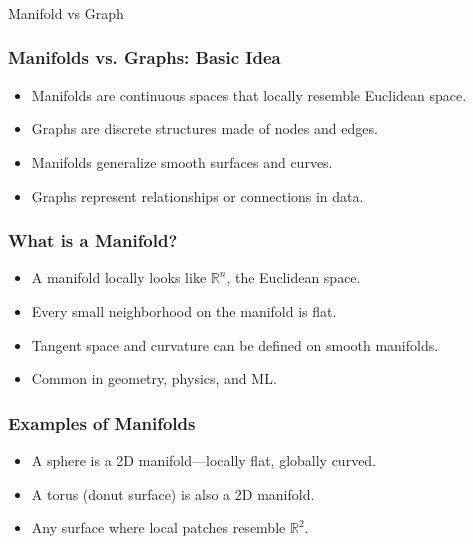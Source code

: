 \begin{frame}[fragile]\frametitle{}
\begin{center}
{\Large Manifold vs Graph}
\end{center}
\end{frame}

\begin{frame}[fragile]\frametitle{Manifolds vs. Graphs: Basic Idea}
    \begin{itemize}
        \item Manifolds are continuous spaces that locally resemble Euclidean space.
        \item Graphs are discrete structures made of nodes and edges.
        \item Manifolds generalize smooth surfaces and curves.
        \item Graphs represent relationships or connections in data.
    \end{itemize}
\end{frame}

\begin{frame}[fragile]\frametitle{What is a Manifold?}
    \begin{itemize}
        \item A manifold locally looks like \(\mathbb{R}^n\), the Euclidean space.
        \item Every small neighborhood on the manifold is flat.
        \item Tangent space and curvature can be defined on smooth manifolds.
        \item Common in geometry, physics, and ML.
    \end{itemize}
\end{frame}

\begin{frame}[fragile]\frametitle{Examples of Manifolds}
    \begin{itemize}
        \item A sphere is a 2D manifold—locally flat, globally curved.
        \item A torus (donut surface) is also a 2D manifold.
        \item Any surface where local patches resemble \(\mathbb{R}^2\).
    \end{itemize}
\end{frame}

